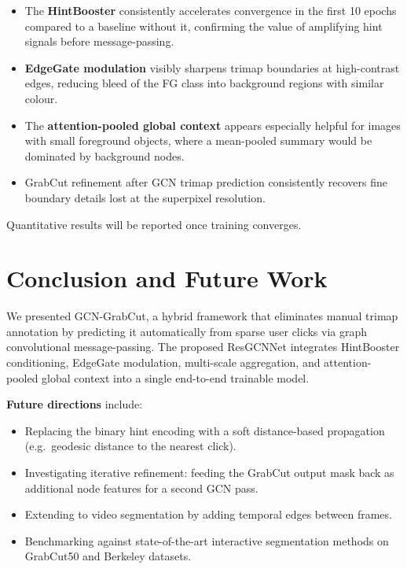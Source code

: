 \documentclass[11pt]{article}
\begin{document}
\begin{itemize}[itemsep=3pt]
  \item The \textbf{HintBooster} consistently accelerates convergence in the first 10 epochs
        compared to a baseline without it, confirming the value of amplifying hint signals
        before message-passing.
  \item \textbf{EdgeGate modulation} visibly sharpens trimap boundaries at high-contrast
        edges, reducing bleed of the FG class into background regions with similar colour.
  \item The \textbf{attention-pooled global context} appears especially helpful for images
        with small foreground objects, where a mean-pooled summary would be dominated by
        background nodes.
  \item GrabCut refinement after GCN trimap prediction consistently recovers fine boundary
        details lost at the superpixel resolution.
\end{itemize}

Quantitative results will be reported once training converges.

\section{Conclusion and Future Work}

We presented GCN-GrabCut, a hybrid framework that eliminates manual trimap annotation by
predicting it automatically from sparse user clicks via graph convolutional message-passing.
The proposed ResGCNNet integrates HintBooster conditioning, EdgeGate modulation, multi-scale
aggregation, and attention-pooled global context into a single end-to-end trainable model.

\medskip
\noindent\textbf{Future directions} include:
\begin{itemize}[itemsep=2pt]
  \item Replacing the binary hint encoding with a soft distance-based propagation
        (e.g.\ geodesic distance to the nearest click).
  \item Investigating iterative refinement: feeding the GrabCut output mask back as
        additional node features for a second GCN pass.
  \item Extending to video segmentation by adding temporal edges between frames.
  \item Benchmarking against state-of-the-art interactive segmentation methods on
        GrabCut50 and Berkeley datasets.
\end{itemize}
\end{document}
